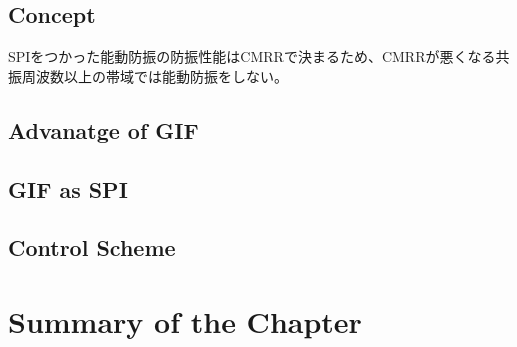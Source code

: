 \subsection{Concept}
SPIをつかった能動防振の防振性能はCMRRで決まるため、CMRRが悪くなる共振周波数以上の帯域では能動防振をしない。


\subsection{Advanatge of GIF}
\subsection{GIF as SPI}
\subsection{Control Scheme}


\section{Summary of the Chapter}
